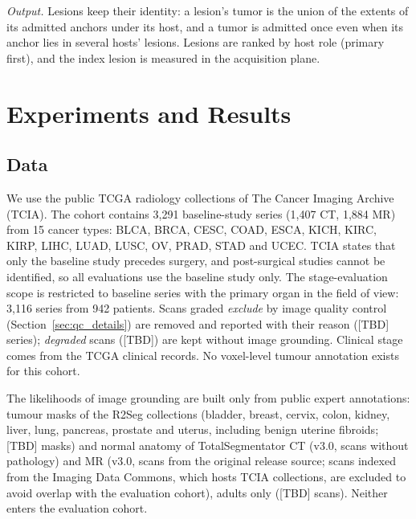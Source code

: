 \documentclass[fleqn,10pt]{olplainarticle}
\begin{document}
\emph{Output.} Lesions keep their identity: a lesion's tumor is the union of the extents of its admitted anchors under its
host, and a tumor is admitted once even when its anchor lies in several hosts' lesions. Lesions are ranked by host role
(primary first), and the index lesion is measured in the acquisition plane.

\section{Experiments and Results}
\label{sec:results}

\subsection{Data}
We use the public TCGA radiology collections of The Cancer Imaging Archive (TCIA). The cohort contains 3{,}291
baseline-study series (1{,}407 CT, 1{,}884 MR) from 15 cancer types: BLCA, BRCA, CESC, COAD, ESCA, KICH, KIRC, KIRP,
LIHC, LUAD, LUSC, OV, PRAD, STAD and UCEC. TCIA states that only the baseline study precedes surgery, and post-surgical
studies cannot be identified, so all evaluations use the baseline study only. The stage-evaluation scope is restricted
to baseline series with the primary organ in the field of view: 3{,}116 series from 942 patients. Scans graded \emph{exclude} by image quality control (Section~\ref{sec:qc_details}) are removed and reported with their reason ([TBD] series); \emph{degraded} scans ([TBD]) are kept without image grounding. Clinical stage comes
from the TCGA clinical records. No voxel-level tumour annotation exists for this cohort.

The likelihoods of image grounding are built only from public expert annotations: tumour masks of the R2Seg collections
(bladder, breast, cervix, colon, kidney, liver, lung, pancreas, prostate and uterus, including benign uterine fibroids;
[TBD] masks) and normal anatomy of
TotalSegmentator CT (v3.0, scans without pathology) and MR (v3.0, scans from the original release source; scans indexed from the
Imaging Data Commons, which hosts TCIA collections, are excluded to avoid overlap with the evaluation cohort), adults only ([TBD] scans). Neither enters the evaluation cohort.
\end{document}
